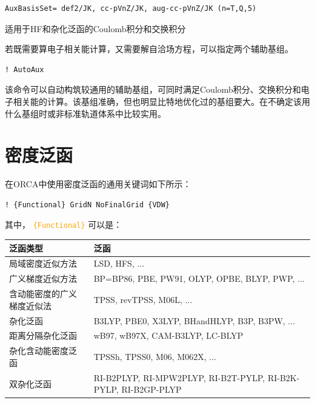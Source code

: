 \documentclass{ctexart}
\newcommand{\cmd}[1]{ \textcolor{orange}{\texttt{#1}} }
\begin{document}
	\begin{lstlisting}
AuxBasisSet= def2/JK, cc-pVnZ/JK, aug-cc-pVnZ/JK (n=T,Q,5)
	\end{lstlisting}
	适用于HF和杂化泛函的Coulomb积分和交换积分
	
	若既需要算电子相关能计算，又需要解自洽场方程，可以指定两个辅助基组。
	
	\begin{lstlisting}
! AutoAux
	\end{lstlisting}
	
	该命令可以自动构筑较通用的辅助基组，可同时满足Coulomb积分、交换积分和电子相关能的计算。该基组准确，但也明显比特地优化过的基组要大。在不确定该用什么基组时或非标准轨道体系中比较实用。
	
	\section{密度泛函}
	
	在ORCA中使用密度泛函的通用关键词如下所示：
	\begin{lstlisting}
! {Functional} GridN NoFinalGrid {VDW}
	\end{lstlisting}
	其中，\cmd{\{Functional\}}可以是：
	\begin{table}[H]
		\centering
		\begin{tabularx}{0.9\linewidth}{lX}
			\toprule
			\textbf{泛函类型}          & \textbf{泛函}                                                             \\
			\midrule
			局域密度近似方法      & LSD, HFS, ...                                                    \\
			广义梯度近似方法      & BP=BP86, PBE, PW91, OLYP, OPBE, BLYP, PWP, ...                   \\
			含动能密度的广义梯度近似法 & TPSS, revTPSS, M06L, ...                                         \\
			杂化泛函          & B3LYP, PBE0, X3LYP, BHandHLYP, B3P, B3PW, ...                    \\
			距离分隔杂化泛函      & wB97, wB97X, CAM-B3LYP, LC-BLYP                                \\
			杂化含动能密度泛函     & TPSSh, TPSS0, M06, M062X, ...                                  \\
			双杂化泛函         & RI-B2PLYP, RI-MPW2PLYP, RI-B2T-PYLP, RI-B2K-PYLP, RI-B2GP-PLYP\\
			\bottomrule
		\end{tabularx}
	\end{table}
	
\end{document}
